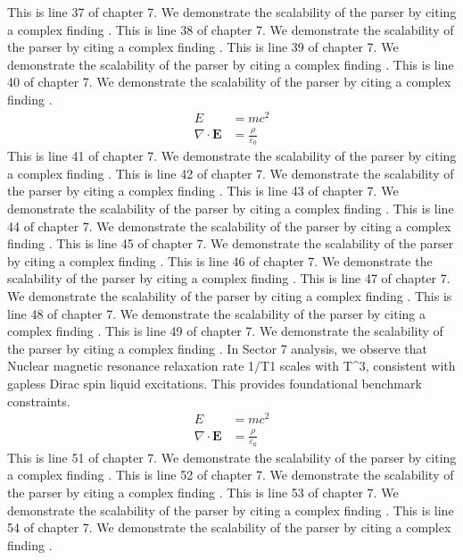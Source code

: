 This is line 37 of chapter 7. We demonstrate the scalability of the parser by citing a complex finding \cite{ref7_37}.
This is line 38 of chapter 7. We demonstrate the scalability of the parser by citing a complex finding \cite{ref7_38}.
This is line 39 of chapter 7. We demonstrate the scalability of the parser by citing a complex finding \cite{ref7_39}.
This is line 40 of chapter 7. We demonstrate the scalability of the parser by citing a complex finding \cite{ref7_40}.
\begin{align*}
  E &= mc^2 \\
  \nabla \cdot \mathbf{E} &= \frac{\rho}{\varepsilon_0}
\end{align*}
This is line 41 of chapter 7. We demonstrate the scalability of the parser by citing a complex finding \cite{ref7_41}.
This is line 42 of chapter 7. We demonstrate the scalability of the parser by citing a complex finding \cite{ref7_42}.
This is line 43 of chapter 7. We demonstrate the scalability of the parser by citing a complex finding \cite{ref7_43}.
This is line 44 of chapter 7. We demonstrate the scalability of the parser by citing a complex finding \cite{ref7_44}.
This is line 45 of chapter 7. We demonstrate the scalability of the parser by citing a complex finding \cite{ref7_45}.
This is line 46 of chapter 7. We demonstrate the scalability of the parser by citing a complex finding \cite{ref7_46}.
This is line 47 of chapter 7. We demonstrate the scalability of the parser by citing a complex finding \cite{ref7_47}.
This is line 48 of chapter 7. We demonstrate the scalability of the parser by citing a complex finding \cite{ref7_48}.
This is line 49 of chapter 7. We demonstrate the scalability of the parser by citing a complex finding \cite{ref7_49}.
In Sector 7 analysis, we observe that Nuclear magnetic resonance relaxation rate 1/T1 scales with T^3, consistent with gapless Dirac spin liquid excitations. This provides foundational benchmark constraints.
\begin{align*}
  E &= mc^2 \\
  \nabla \cdot \mathbf{E} &= \frac{\rho}{\varepsilon_0}
\end{align*}
This is line 51 of chapter 7. We demonstrate the scalability of the parser by citing a complex finding \cite{ref7_51}.
This is line 52 of chapter 7. We demonstrate the scalability of the parser by citing a complex finding \cite{ref7_52}.
This is line 53 of chapter 7. We demonstrate the scalability of the parser by citing a complex finding \cite{ref7_53}.
This is line 54 of chapter 7. We demonstrate the scalability of the parser by citing a complex finding \cite{ref7_54}.
